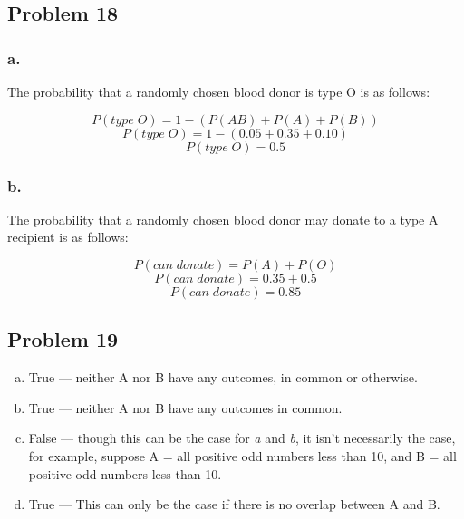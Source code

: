 \documentclass[11pt]{article}
\begin{document}
\subsection*{Problem 18}
\subsubsection*{a.}
The probability that a randomly chosen blood donor is type O is as follows:

\[ P(type\;O) = 1 - \left( P(AB) + P(A) + P(B) \right) \]
\[ P(type\;O) = 1 - \left( 0.05 + 0.35 + 0.10 \right) \]
\[ P(type\;O) = 0.5 \]

\subsubsection*{b.}
The probability that a randomly chosen blood donor may donate to a type A
recipient is as follows:

\[ P(can\;donate) = P(A) + P(O) \]
\[ P(can\;donate) = 0.35 + 0.5 \]
\[ P(can\;donate) = 0.85 \]

\subsection*{Problem 19}
\begin{enumerate}[a.]
    \item True --- neither A nor B have any outcomes, in common or otherwise.
    \item True --- neither A nor B have any outcomes in common.
    \item False --- though this can be the case for \textit{a} and
        \textit{b}, it isn't necessarily the case, for example, suppose A = all
        positive odd numbers less than 10, and B = all positive odd numbers less
        than 10. 
    \item True --- This can only be the case if there is no overlap between A and
        B. 
\end{enumerate}
\end{document}

